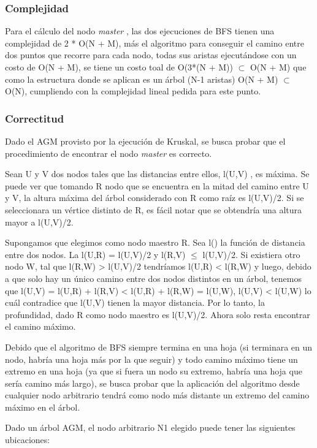 \documentclass[a4paper, 10pt, twoside]{article}
\begin{document}
\subsubsection{Complejidad}

Para el cálculo del nodo \textit{master} , las dos ejecuciones de BFS tienen una complejidad de 2 * O(N + M), más el algoritmo para conseguir el camino entre dos puntos que recorre para cada nodo, todas sus aristas ejecutándose con un costo de O(N + M), se tiene un costo toal de O(3*(N + M)) $\subset$ O(N + M) que como la estructura donde se aplican es un árbol (N-1 aristas) O(N + M) $\subset$ O(N), cumpliendo con la complejidad lineal pedida para este punto.

\subsubsection{Correctitud}

Dado el AGM provisto por la ejecución de Kruskal, se busca probar que el procedimiento de encontrar el nodo \textit{master} es correcto.

Sean U y V dos nodos tales que las distancias entre ellos, l(U,V) , es máxima. Se puede ver que tomando R nodo que se encuentra en la mitad del camino entre U y V, la altura máxima del árbol considerado con R como raíz es l(U,V)/2. Si se seleccionara un vértice distinto de R, es fácil notar que se obtendría una altura mayor a l(U,V)/2.

Supongamos que elegimos como nodo maestro R. Sea l() la función de distancia entre dos nodos. La l(U,R) = l(U,V)/2 y l(R,V) $\leq$ l(U,V)/2. Si existiera otro nodo W, tal que l(R,W) > l(U,V)/2 tendríamos l(U,R) < l(R,W) y luego, debido a que solo hay un único camino entre dos nodos distintos en un árbol, tenemos que l(U,V) = l(U,R) + l(R,V) < l(U,R) + l(R,W) = l(U,W), l(U,V) < l(U,W) lo cuál contradice que l(U,V) tienen la mayor distancia. Por lo tanto, la profundidad, dado R como nodo maestro es l(U,V)/2. Ahora solo resta encontrar el camino máximo.

Debido que el algoritmo de BFS siempre termina en una hoja (si terminara en un nodo, habría una hoja más por la que seguir) y todo camino máximo tiene un extremo en una hoja (ya que si fuera un nodo su extremo, habría una hoja que sería camino más largo), se busca probar que la aplicación del algoritmo desde cualquier nodo arbitrario tendrá como nodo más distante un extremo del camino máximo en el árbol.

Dado un árbol AGM, el nodo arbitrario N1 elegido puede tener las siguientes ubicaciones:
\end{document}

